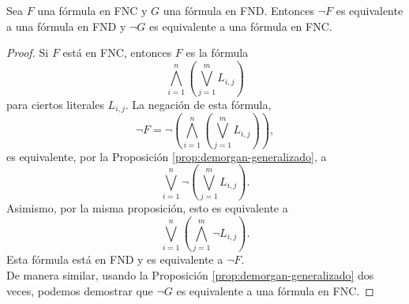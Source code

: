 \message{ !name(main.tex)}\documentclass[12pt,a4paper]{book}
\begin{document}
    \begin{lema}\label{lema:negacion-fnc-fnd}
        Sea $F$ una fórmula en FNC y $G$ una fórmula en FND. Entonces $\neg F$ es equivalente a una fórmula en FND y $\neg G$
        es equivalente a una fórmula en FNC.
    \end{lema}
    \begin{proof}
        Si $F$ está en FNC, entonces $F$ es la fórmula
        \begin{equation*}
            \bigwedge_{i=1}^{n}\left(\bigvee_{j=1}^{m}L_{i,j}\right)
        \end{equation*}
        para ciertos literales $L_{i,j}$. La negación de esta fórmula,
        \begin{equation*}
            \neg F=\neg\left(\bigwedge_{i=1}^{n}\left(\bigvee_{j=1}^{m}L_{i,j}\right)\right),
        \end{equation*}
        es equivalente, por la Proposición \ref{prop:demorgan-generalizado}, a
        \begin{equation*}
            \bigvee_{i=1}^{n}\neg\left(\bigvee_{j=1}^{m}L_{i,j}\right).
        \end{equation*}
        Asimismo, por la misma proposición, esto es equivalente a
        \begin{equation*}
            \bigvee_{i=1}^{n}\left(\bigwedge_{j=1}^{m}\neg L_{i,j}\right).
        \end{equation*}
        Esta fórmula está en FND y es equivalente a $\neg F$.\\
        De manera similar, usando la Proposición \ref{prop:demorgan-generalizado} dos veces, podemos demostrar que $\neg G$
        es equivalente a una fórmula en FNC.
    \end{proof}
\end{document}
